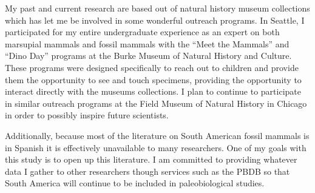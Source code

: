 \documentclass[11pt,letterpaper]{article}
\begin{document}
My past and current research are based out of natural history museum collections which has let me be involved in some wonderful outreach programs. In Seattle, I participated for my entire undergraduate experience as an expert on both marsupial mammals and fossil mammals with the ``Meet the Mammals'' and ``Dino Day'' programs at the Burke Museum of Natural History and Culture. These programs were designed specifically to reach out to children and provide them the opportunity to see and touch specimens, providing the opportunity to interact directly with the museums collections. I plan to continue to participate in similar outreach programs at the Field Museum of Natural History in Chicago in order to possibly inspire future scientists.

Additionally, because most of the literature on South American fossil mammals is in Spanish it is effectively unavailable to many researchers. One of my goals with this study is to open up this literature. I am committed to providing whatever data I gather to other researchers though services such as the PBDB so that South America will continue to be included in paleobiological studies.



\end{document}
